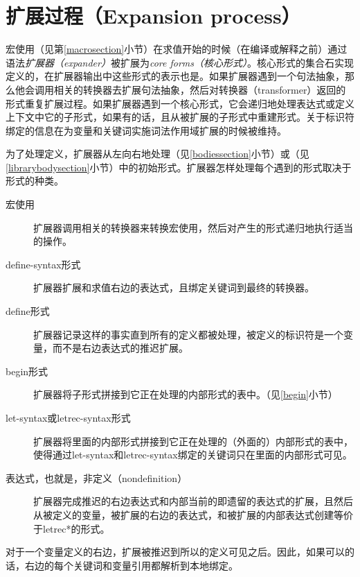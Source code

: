 \chapter{扩展过程（Expansion process）}
\label{expansionchapter}

宏使用（见第\ref{macrosection}小节）在求值开始的时候（在编译或解释之前）通过语法\emph{扩展器（expander）}被扩展为\textit{core forms（核心形式）}。核心形式的集合石实现定义的，在扩展器输出中这些形式的表示也是。如果扩展器遇到一个句法抽象，那么他会调用相关的转换器去扩展句法抽象，然后对转换器（transformer）返回的形式重复扩展过程。如果扩展器遇到一个核心形式，它会递归地处理表达式或定义上下文中它的子形式，如果有的话，且从被扩展的子形式中重建形式。关于标识符绑定的信息在为变量和关键词实施词法作用域扩展的时候被维持。

为了处理定义，扩展器从左向右地处理（见\ref{bodiessection}小节）或（见\ref{librarybodysection}小节）中的初始形式。扩展器怎样处理每个遇到的形式取决于形式的种类。

\begin{description}
\item[宏使用]
扩展器调用相关的转换器来转换宏使用，然后对产生的形式递归地执行适当的操作。

\item[{\cf define-syntax}形式]
扩展器扩展和求值右边的表达式，且绑定关键词到最终的转换器。

\item[{\cf define}形式]
扩展器记录这样的事实直到所有的定义都被处理，被定义的标识符是一个变量，而不是右边表达式的推迟扩展。

\item[{\cf begin}形式]
扩展器将子形式拼接到它正在处理的内部形式的表中。（见\ref{begin}小节）

\item[{\cf let-syntax}或{\cf letrec-syntax}形式]
扩展器将里面的内部形式拼接到它正在处理的（外面的）内部形式的表中，使得通过{\cf let-syntax}和{\cf letrec-syntax}绑定的关键词只在里面的内部形式可见。

\item[表达式，也就是，非定义（nondefinition）]
扩展器完成推迟的右边表达式和内部当前的即遗留的表达式的扩展，且然后从被定义的变量，被扩展的右边的表达式，和被扩展的内部表达式创建等价于{\cf letrec*}的形式。
\end{description}

对于一个变量定义的右边，扩展被推迟到所以的定义可见之后。因此，如果可以的话，右边的每个关键词和变量引用都解析到本地绑定。

